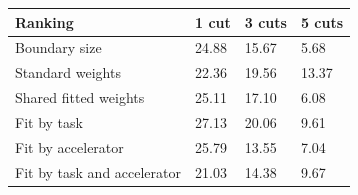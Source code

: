 \begin{tabular}{@{}llll@{}}
\toprule
Ranking & 1 cut & 3 cuts & 5 cuts \\
\midrule
Boundary size & 24.88 & 15.67 & 5.68 \\
Standard weights & 22.36 & 19.56 & 13.37 \\
Shared fitted weights & 25.11 & 17.10 & 6.08 \\
Fit by task & 27.13 & 20.06 & 9.61 \\
Fit by accelerator & 25.79 & 13.55 & 7.04 \\
Fit by task and accelerator & 21.03 & 14.38 & 9.67 \\
\bottomrule
\end{tabular}
